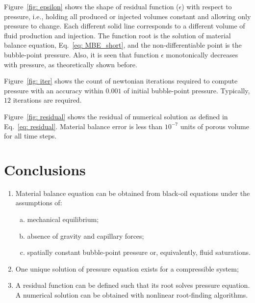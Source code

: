 \documentclass[authoryear,preprint,review,11pt]{elsarticle}
\begin{document}
Figure~\ref{fig: epsilon} shows the shape of residual function ($\epsilon$) with respect to pressure, i.e., holding all produced or injected volumes constant and allowing only pressure to change. Each different solid line corresponds to a different volume of fluid production and injection. The function root is the solution of material balance equation, Eq.~\eqref{eq: MBE_short}, and the non-differentiable point is the bubble-point pressure. Also, it is seen that function $\epsilon$ monotonically decreases with pressure, as theoretically shown before.

Figure~\ref{fig: iter} shows the count of newtonian iterations required to compute pressure with an accuracy within $0.001$ of initial bubble-point pressure. Typically, $12$ iterations are required.

Figure~\ref{fig: residual} shows the residual of numerical solution as defined in Eq.~\eqref{eq: residual}. Material balance error is less than $10^{-7}$ units of porous volume for all time steps.



\section{Conclusions}
\begin{enumerate}[1.]
\item Material balance equation can be obtained from black-oil equations under the assumptions of:
\begin{enumerate}[(a)]
\item mechanical equilibrium;
\item absence of gravity and capillary forces;
\item spatially constant bubble-point pressure or, equivalently, fluid saturations.
\end{enumerate}
\item One unique solution of pressure equation exists for a compressible system;
\item A residual function can be defined such that its root solves pressure equation. A numerical solution can be obtained with nonlinear root-finding algorithms.
\end{enumerate}
\end{document}
